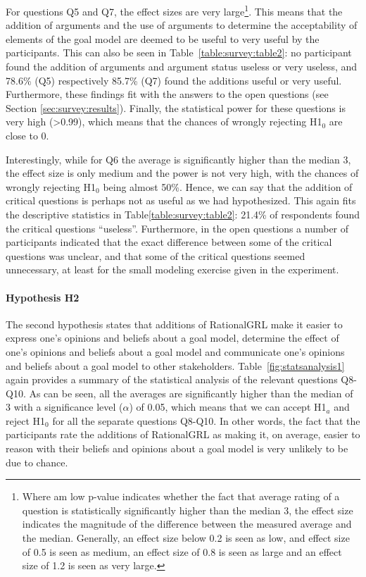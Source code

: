 For questions Q5 and Q7, the effect sizes are very large\footnote{Where am low p-value indicates whether the fact that average rating of a question is statistically significantly higher than the median 3, the effect size indicates the magnitude of the difference between the measured average and the median. Generally, an effect size below 0.2 is seen as low, and effect size of 0.5 is seen as medium, an effect size of 0.8 is seen as large and an effect size of 1.2 is seen as very large.}. This means that the addition of arguments and the use of arguments to determine the acceptability of elements of the goal model are deemed to be useful to very useful by the participants. This can also be seen in Table~\ref{table:survey:table2}: no participant found the addition of arguments and argument status useless or very useless, and 78.6\% (Q5) respectively 85.7\% (Q7) found the additions useful or very useful. Furthermore, these findings fit with the answers to the open questions (see Section \ref{sec:survey:results}). Finally, the statistical power for these questions is very high (>0.99), which means that the chances of wrongly rejecting H1$_{0}$ are close to 0. 

Interestingly, while for Q6 the average is significantly higher than the median 3, the effect size is only medium and the power is not very high, with the chances of wrongly rejecting H1$_{0}$ being almost 50\%. Hence, we can say that the addition of critical questions is perhaps not as useful as we had hypothesized. This again fits the descriptive statistics in Table\ref{table:survey:table2}: 21.4\% of respondents found the critical questions ``useless''. Furthermore, in the open questions a number of participants indicated that the exact difference between some of the critical questions was unclear, and that some of the critical questions seemed unnecessary, at least for the small modeling exercise given in the experiment.

\paragraph{Hypothesis H2}
The second hypothesis states that additions of RationalGRL make it easier to express one's opinions and beliefs about a goal model, determine the effect of one's opinions and beliefs about a goal model and communicate one's opinions and beliefs about a goal model to other stakeholders. Table~\ref{fig:statsanalysis1} again provides a summary of the statistical analysis of the relevant questions Q8-Q10. As can be seen, all the averages are significantly higher than the median of 3 with a significance level ($\alpha$) of 0.05, which means that we can accept H1$_{a}$ and reject H1$_{0}$ for all the separate questions Q8-Q10. In other words, the fact that the participants rate the additions of RationalGRL as making it, on average, easier to reason with their beliefs and opinions about a goal model is very unlikely to be due to chance. 

